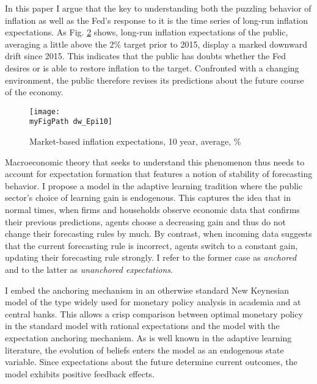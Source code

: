 \documentclass[11pt]{article}
\def \myFigPath {../../figures/}
\renewcommand{\[}{\begin{equation}}
\renewcommand{\]}{\end{equation}}
\def\mySmallerFigScale{0.18}
\begin{document}

\begin{figure}[h!]
\caption{}
\label{urate_FFR}
\end{figure}

In this paper I argue that the key to understanding both the puzzling behavior of inflation as well as the Fed's response to it is the time series of long-run inflation expectations. As Fig. \ref{LRinflexp} shows, long-run inflation expectations of the public, averaging a little above the 2\% target prior to 2015, display a marked downward drift since 2015. This indicates that the public has doubts whether the Fed desires or is able to restore inflation to the target. Confronted with a changing environment, the public therefore revises its predictions about the future course of the economy.
\begin{figure}[h!]
\texttt{[image: \\myFigPath dw\_Epi10]}
\caption{Market-based inflation expectations, 10 year, average, \%}
\label{LRinflexp}
\end{figure}

Macroeconomic theory that seeks to understand this phenomenon thus needs to account for expectation formation that features a notion of stability of forecasting behavior. I propose a model in the adaptive learning tradition where the public sector's choice of learning gain is endogenous. This captures the idea that in normal times, when firms and households observe economic data that confirms their previous predictions, agents choose a decreasing gain and thus do not change their forecasting rules by much. By contrast, when incoming data suggests that the current forecasting rule is incorrect, agents switch to a constant gain, updating their forecasting rule strongly. I refer to the former case as \emph{anchored} and to the latter as \emph{unanchored expectations}.

I embed the anchoring mechanism in an otherwise standard New Keynesian model of the type widely used for monetary policy analysis in academia and at central banks. This allows a crisp comparison between optimal monetary policy in the standard model with rational expectations and the model with the expectation anchoring mechanism. As is well known in the adaptive learning literature, the evolution of beliefs enters the model as an endogenous state variable. Since expectations about the future determine current outcomes, the model exhibits positive feedback effects.
\end{document}
